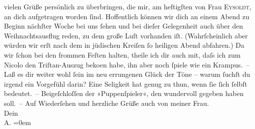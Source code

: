 \begin{ledgroupsized}[t]{13cm}
               vielen Grüße persönlich zu überbringen, die mir, am heftigſten von Frau \textsc{Eysoldt}, an dich aufgetragen worden ſind. Hoffentlich können wir dich an einem Abend zu
               Beginn nächſter Woche bei uns ſehen {\pb}und bei dieſer
               Gelegenheit auch über den Weihnachtsausflug reden, zu dem große Luſt vorhanden iſt.
               (Wahrſcheinlich aber würden wir erſt nach dem in jüdischen Kreiſen ſo heiligen Abend
               abfahren.) Da wir ſchon bei den frommen Feſten halten, theile ich dir auch mit, daſs
               ich zum Nicolo den Triſtan-Auszug beko{\geminationm}en habe, ihn aber {\pb}noch ſpiele wie ein
               Krampus. –\pend
           \pstart
           Laß es dir weiter wohl ſein im neu errungenen Glück der Töne – warum ſuchſt du irgend
               ein Vorgefühl darin? Eine Seligkeit hat genug 
               zu thun, wenn ſie ſich ſelbſt bedeutet. – \pend
           \pstart
           Beigeſchloſſen der »Puppenſpieler«, den \label{K_L01475_2v}\label{K_L01475_2h} wundervoll gegeben haben soll. –\pend
           \pstart
           Auf Wiederſehen und herzliche Grüße {\pb}auch von meiner Frau.{\\[\baselineskip]}Dein{\\[\baselineskip]}\spacefill\mbox{A.}\pend
           \leftskip=0em{}          \endnumbering{}\end{ledgroupsized}  \newcommand{\dateiname}{L01475}\newcommand{\titel}{Arthur Schnitzler an Hermann Bahr, 5. 12. 1904}\newcommand{\editorInnen}{ Kurt Ifkovits,  Martin Anton Müller}
            \footnotesize
\begin{ledgroupsized}[t]{11.5cm}
\end{ledgroupsized}
         
      